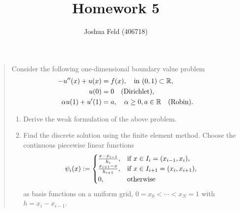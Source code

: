 \documentclass[english]{exercise}
\title{Homework 5}
\author{Joshua Feld (406718)}
\begin{document}
    \maketitle


    \section{}

    \begin{quote}
        Consider the following one-dimensional boundary value problem
        \begin{align*}
            -u''\parentheses*{x} + u\parentheses*{x} &= f\parentheses*{x}, \quad \text{in }\parentheses*{0, 1} \subset \R,\\
            u\parentheses*{0} &= 0 \quad \text{(Dirichlet)},\\
            \alpha u\parentheses*{1} + u'\parentheses*{1} &= a, \quad \alpha \ge 0, a \in \R \quad \text{(Robin)}.
        \end{align*}
        \begin{enumerate}
            \item Derive the weak formulation of the above problem.
            \item Find the discrete solution using the finite element method.
            Choose the continuous piecewise linear functions
            \[
                \psi_i\parentheses*{x} := \begin{cases}
                    \frac{x - x_{i - 1}}{h_i}, & \text{if }x \in I_i = \parentheses*{x_{i - 1}, x_i},\\
                    \frac{x_{i + 1} - x}{h_{i + 1}}, & \text{if }x \in I_{i + 1} = \parentheses*{x_i, x_{i + 1}},\\
                    0, & \text{otherwise}
                \end{cases}
            \]
            as basis functions on a uniform grid, \(0 = x_0 < \cdots < x_N = 1\) with \(h = x_i - x_{i - 1}\).
        \end{enumerate}
    \end{quote}
    
\end{document}
